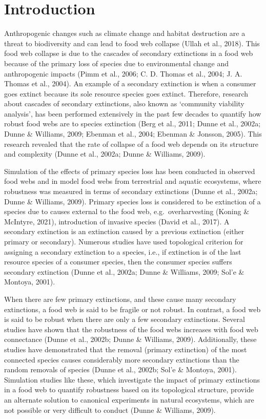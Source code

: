 \documentclass{article}
\begin{document}

\hypertarget{introduction}{%
\section{Introduction}\label{introduction}}

Anthropogenic changes such as climate change and habitat destruction are
a threat to biodiversity and can lead to food web collapse (Ullah et
al., 2018). This food web collapse is due to the cascades of secondary
extinctions in a food web because of the primary loss of species due to
environmental change and anthropogenic impacts (Pimm et al., 2006; C. D.
Thomas et al., 2004; J. A. Thomas et al., 2004). An example of a
secondary extinction is when a consumer goes extinct because its sole
resource species goes extinct. Therefore, research about cascades of
secondary extinctions, also known as `community viability analysis', has
been performed extensively in the past few decades to quantify how
robust food webs are to species extinction (Berg et al., 2011; Dunne et
al., 2002a; Dunne \& Williams, 2009; Ebenman et al., 2004; Ebenman \&
Jonsson, 2005). This research revealed that the rate of collapse of a
food web depends on its structure and complexity (Dunne et al., 2002a;
Dunne \& Williams, 2009).

Simulation of the effects of primary species loss has been conducted in
observed food webs and in model food webs from terrestrial and aquatic
ecosystems, where robustness was measured in terms of secondary
extinctions (Dunne et al., 2002a; Dunne \& Williams, 2009). Primary
species loss is considered to be extinction of a species due to causes
external to the food web, e.g.~overharvesting (Koning \& McIntyre,
2021), introduction of invasive species (David et al., 2017). A
secondary extinction is an extinction caused by a previous extinction
(either primary or secondary). Numerous studies have used topological
criterion for assigning a secondary extinction to a species, i.e., if
extinction is of the last resource species of a consumer species, then
the consumer species suffers secondary extinction (Dunne et al., 2002a;
Dunne \& Williams, 2009; Sol'e \& Montoya, 2001).

When there are few primary extinctions, and these cause many secondary
extinctions, a food web is said to be fragile or not robust. In
contrast, a food web is said to be robust when there are only a few
secondary extinctions. Several studies have shown that the robustness of
the food webs increases with food web connectance (Dunne et al., 2002b;
Dunne \& Williams, 2009). Additionally, these studies have demonstrated
that the removal (primary extinction) of the most connected species
causes considerably more secondary extinctions than the random removals
of species (Dunne et al., 2002b; Sol'e \& Montoya, 2001). Simulation
studies like these, which investigate the impact of primary extinctions
in a food web to quantify robustness based on its topological structure,
provide an alternate solution to canonical experiments in natural
ecosystems, which are not possible or very difficult to conduct (Dunne
\& Williams, 2009).
\end{document}
